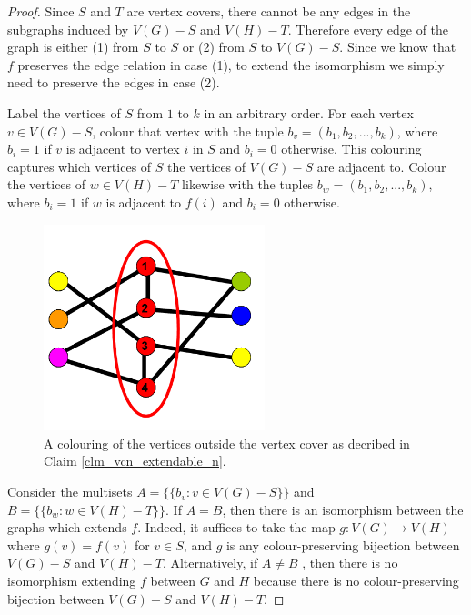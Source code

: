 \documentclass[11pt]{report}
\begin{document}
\begin{proof} 

Since $S$ and $T$ are vertex covers, there cannot be any edges in the subgraphs induced by $V(G)-S$ and $V(H) -T$. Therefore every edge of the graph is either (1) from $S$ to $S$  or (2) from $S$ to $V(G)-S$.  Since we know that $f$ preserves the edge relation in case (1), to extend the isomorphism we simply need to preserve the edges in case (2).

Label the vertices of $S$ from $1$ to $k$ in an arbitrary order. For each vertex $v\in V(G)-S$, colour that vertex with the tuple $b_v = (b_1 , b_2, ... , b_k)$, where $b_i = 1$ if $v$ is adjacent to vertex $i$ in $S$ and $b_i = 0$ otherwise.  This colouring captures which vertices of $S$  the vertices of $V(G)-S$ are adjacent to. Colour the vertices of $w\in V(H)-T$ likewise with the tuples $b_w = (b_1 , b_2, ... , b_k)$, where $b_i = 1$ if $w$ is adjacent to $f(i)$ and $b_i = 0$ otherwise.


\begin{figure}[h]
\begin{center}
\leavevmode
\includegraphics[height=60mm]{Vertex_Cover_colouring_v1.png}
\end{center}
\caption{A colouring of the vertices outside the vertex cover as decribed in Claim \ref{clm_vcn_extendable_n}.}
\label{fig:three}
\end{figure}



Consider the multisets $A=\{\{b_v : v \in V(G)-S  \}\}$ and $B=\{\{b_w : w \in V(H)-T  \}\}$. If $A=B$, then there is an isomorphism between the graphs which extends $f$. Indeed, it suffices to take the map $g: V(G) \rightarrow V(H)$ where $g(v)=f(v)$ for $v\in S$, and $g$ is any colour-preserving bijection between $V(G)-S$ and $V(H)-T$. Alternatively, if $A\neq B$ , then there is no isomorphism extending $f$ between $G$ and $H$ because there is no colour-preserving bijection between $V(G)-S$ and $V(H)-T$.


\end{proof}
\end{document}
